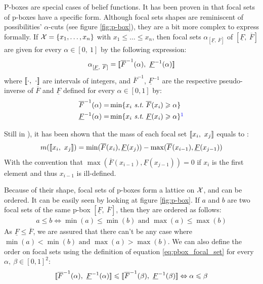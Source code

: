\begin{definition}
    P-boxes are special cases of belief functions. It has been proven in \cite{destercke_unifying_2008} that focal sets of p-boxes have a specific form. Although focal sets shapes are reminiscent of possibilities' $\alpha$-cuts (see figure \ref{fig:p-box}), they are a bit more complex to express formally. If ${\mathcal{X}}=\{x_1, \dots, x_n\}$ with $x_1\leqslant\dots\leqslant x_n$, then focal sets $\alpha_{[\underline{F}, ~\overline{F}]}$ of $[\underline{F}, ~\overline{F}]$ are given for every $\alpha\in[0,~1]$ by the following expression:
    \begin{align}
        \alpha_{[\underline{F}, ~\overline{F}]}= {[\![} \overline{F}^{-1}(\alpha),~\underline{F}^{-1}(\alpha){]\!]}\label{eq:pbox_focal_set}
    \end{align}
    where ${[\![}\cdot,~\cdot{]\!]}$ are intervals of integers, and $\overline{F}^{-1}$, $\underline{F}^{-1}$ are the respective pseudo-inverse of $\overline{F}$ and $\underline{F}$ defined for every $\alpha\in[0,1]$ by:
    \begin{align*}
        \overline{F}^{-1}(\alpha) =& \min \{x_i ~\st ~\overline{F}(x_i)\geqslant \alpha\}\\
        \underline{F}^{-1}(\alpha) =& \min \{x_i ~\st ~\underline{F}(x_i)\geqslant \alpha\}\commanue{c'est pas un max?}
    \end{align*}
    
    Still in \cite{destercke_unifying_2008}), it has been shown that the mass of each focal set ${[\![} x_i, ~x_j{]\!]}$ equals to :
    \begin{align}
        m({[\![} x_i, ~x_j{]\!]}) = \min(\overline{F}(x_i), \underline{F}(x_j)) - \max(\overline{F}(x_{i-1}), \underline{F}(x_{j-1}))
    \end{align}
    With the convention that $\max(\overline{F}(x_{i-1}), \underline{F}(x_{j-1}))=0$ if $x_{i}$ is the first element and thus $x_{i-1}$ is ill-defined. 
\end{definition}

Because of their shape, focal sets of p-boxes form a lattice on ${\mathcal{X}}$, and can be ordered. It can be easily seen by looking at figure \ref{fig:p-box}. If $a$ and $b$ are two focal sets of the same p-box $[\underline{F}, ~\overline{F}]$, then they are ordered as follows:
\begin{align}
    a\leqslant b \Leftrightarrow \min(a)\leqslant\min(b) \text{ and } \max(a)\leqslant \max(b)
\end{align}
As $\underline{F}\leqslant\overline{F}$, we are assured that there can't be any case where $\min(a)<\min(b) \text{ and } \max(a)> \max(b)$. We can also define the order on focal sets using the definition of equation \eqref{eq:pbox_focal_set} for every $\alpha,~\beta\in[0,1]^2$:
\begin{align*}
    {[\![}\overline{F}^{-1}(\alpha), ~\underline{F}^{-1}(\alpha){]\!]} \leqslant {[\![}\overline{F}^{-1}(\beta), ~\underline{F}^{-1}(\beta){]\!]} \Leftrightarrow \alpha\leqslant\beta
\end{align*}

